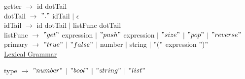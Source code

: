 \documentclass{article}
\begin{document}
getter $\rightarrow$ id dotTail \\

dotTail $\rightarrow$ $"."$ idTail $\vert$ $\epsilon$ \\

idTail $\rightarrow$ id dotTail $\vert$ listFunc dotTail \\

listFunc $\rightarrow$ $"get"$ expression $\vert$ $"push"$ expression $\vert$ $"size"$ $\vert$ $"pop"$ $\vert$ $"reverse"$ \\

primary $\rightarrow$ $"true"$ $\vert$ $"false"$ $\vert$ number $\vert$ string $\vert$ $"("$ expression $")"$ \\

\underline{Lexical Grammar}

type $\rightarrow$ $"number"$ $\vert$ $"bool"$ $\vert$ $"string"$ $\vert$ $"list"$ \\
\end{document}
